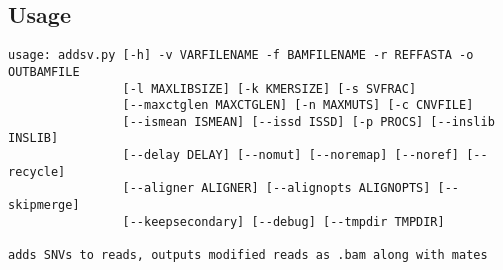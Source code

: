 \documentclass[letterpaper,11pt]{article}
\begin{document}
\subsection{Usage}
\begin{verbatim}
usage: addsv.py [-h] -v VARFILENAME -f BAMFILENAME -r REFFASTA -o OUTBAMFILE
                [-l MAXLIBSIZE] [-k KMERSIZE] [-s SVFRAC]
                [--maxctglen MAXCTGLEN] [-n MAXMUTS] [-c CNVFILE]
                [--ismean ISMEAN] [--issd ISSD] [-p PROCS] [--inslib INSLIB]
                [--delay DELAY] [--nomut] [--noremap] [--noref] [--recycle]
                [--aligner ALIGNER] [--alignopts ALIGNOPTS] [--skipmerge]
                [--keepsecondary] [--debug] [--tmpdir TMPDIR]

adds SNVs to reads, outputs modified reads as .bam along with mates


\end{verbatim}
\end{document}
